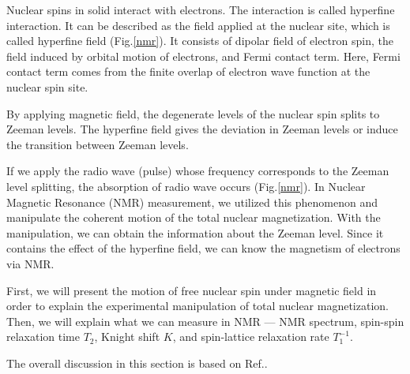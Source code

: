 \documentclass[a4,10.5pt]{report}
\begin{document}
Nuclear spins in solid interact with electrons.
The interaction is called hyperfine interaction.
It can be described as the field applied at the nuclear site, which is called hyperfine field (Fig.\ref{nmr}).
It consists of dipolar field of electron spin, the field induced by orbital motion of electrons, and Fermi contact term.
Here, Fermi contact term comes from the finite overlap of electron wave function at the nuclear spin site.

By applying magnetic field, the degenerate levels of the nuclear spin splits to Zeeman levels.
The hyperfine field gives the deviation in Zeeman levels or induce the transition between Zeeman levels. 

If we apply the radio wave (pulse) whose frequency corresponds to the Zeeman level splitting, the absorption of radio wave occurs (Fig.\ref{nmr}).
In Nuclear Magnetic Resonance (NMR) measurement, we utilized this phenomenon and manipulate the coherent motion of the total nuclear magnetization.
With the manipulation, we can obtain the information about the Zeeman level.
Since it contains the effect of the hyperfine field, we can know the magnetism of electrons via NMR.

First, we will present the motion of free nuclear spin under magnetic field in order to explain the experimental manipulation of total nuclear magnetization.
Then, we will explain what we can measure in NMR --- NMR spectrum, spin-spin relaxation time $T_2$, Knight shift $K$, and spin-lattice relaxation rate $T^{-1}_1$.

The overall discussion in this section is based on Ref.\cite{Kitaoka, Asayama, Takigawa}.
\end{document}
